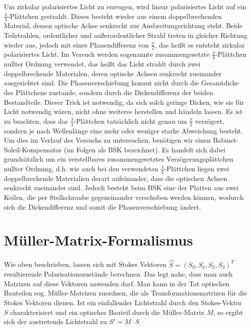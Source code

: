 \documentclass[bigchapter,colorback,accentcolor=tud4b,linedtoc,11pt]{tudreport}
\begin{document}
\vspace{\baselineskip}Um zirkular polarisiertes Licht zu erzeugen, wird linear polarisiertes Licht auf ein $\frac{\lambda}{4}$-Plättchen gestrahlt. Dieses besteht wieder aus einem doppelbrechenden Material, dessen optische Achse senkrecht zur Ausbreitungsrichtung steht. Beide Teilstrahlen, ordentlicher und außerordentlicher Strahl treten in gleicher Richtung wieder aus, jedoch mit einer Phasendifferenz von $\frac{\pi}{2}$, das heißt es entsteht zirkular polarisiertes Licht. Im Versuch werden sogenannte zusammengesetzte $\frac{\lambda}{4}$-Plättchen nullter Ordnung verwendet, das heißt das Licht strahlt durch zwei doppelbrechende Materialen, deren optische Achsen senkrecht zueinander ausgerichtet sind. Die Phasenverschiebung kommt nicht durch die Gesamtdicke des Plättchens zustande, sondern durch die Dickendifferenz der beiden Bestandteile. Dieser Trick ist notwendig, da sich solch geringe Dicken, wie sie für Licht notwendig wären, nicht ohne weiteres herstellen und händeln lassen. Es ist zu beachten, dass das $\frac{\lambda}{4}$-Plättchen tatsächlich nicht genau um $\frac{\pi}{2}$ verzögert, sondern je nach Wellenlänge eine mehr oder weniger starke Abweichung besteht. Um dies im Verlauf des Versuchs zu untersuchen, benötigen wir einen Babinet-Soleil-Kompensator (im Folgen als BSK bezeichnet). Es handelt sich dabei grundsätzlich um ein verstellbares zusammengesetztes Verzögerungsplättchen nullter Ordnung, d.h. wie auch bei den verwendeten $\frac{\lambda}{4}$-Plättchen liegen zwei doppelbrechende Materialien derart aufeinander, dass die optischen Achsen senkrecht zueinander sind. Jedoch besteht beim BSK eine der Platten aus zwei Keilen, die per Stellschraube gegeneinander verschoben werden können, wodurch sich die Dickendifferenz und somit die Phasenverschiebung ändert. 

\section{Müller-Matrix-Formalismus}
Wie oben beschrieben, lassen sich mit Stokes Vektoren $\vec{S}= (S_0, S_1, S_2, S_3)^T$ resultierende Polarisationszustände berechnen. Das legt nahe, dass man auch Matrizen auf diese Vektoren anwenden darf. Man kann in der Tat optischen Bauteilen sog. Müller-Matrizen zuordnen, die als Transformationsmatrizen für die Stokes Vektoren dienen. Ist ein einfallender Lichtstrahl durch den Stokes-Vektor $S$ charakterisiert und ein optisches Bauteil durch die Müller-Matrix $M$, so ergibt sich der austretende Lichtstrahl zu $S' = M \cdot S$ 
\end{document}
